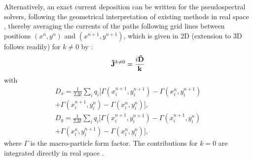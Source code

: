 Alternatively, an exact current deposition can be written for the pseudospectral solvers, following the geometrical interpretation of existing methods in real space \cite{Morsenielson1971,Villasenorcpc92,Esirkepovcpc01}, thereby averaging the currents of the paths following grid lines between positions $(x^n,y^n)$ and $(x^{n+1},y^{n+1})$, which is given in 2D (extension to 3D follows readily) for $k\neq0$ by  \cite{VayJCP2013}:
%
\begin{eqnarray}
\mathbf{\tilde{J}}^{k\neq0}=\frac{i\mathbf{\tilde{D}}}{\mathbf{k}}
\end{eqnarray}
with 
\begin{eqnarray}
D_x   =  \frac{1}{2\Delta t}\sum_i q_i
  [\Gamma(x_i^{n+1},y_i^{n+1})-\Gamma(x_i^{n},y_i^{n+1}) \nonumber\\ 
+\Gamma(x_i^{n+1},y_i^{n})-\Gamma(x_i^{n},y_i^{n})],\\
D_y   =  \frac{1}{2\Delta t}\sum_i q_i
  [\Gamma(x_i^{n+1},y_i^{n+1})-\Gamma(x_i^{n+1},y_i^{n}) \nonumber \\
+\Gamma(x_i^{n},y_i^{n+1})-\Gamma(x_i^{n},y_i^{n})],
\end{eqnarray}
where $\Gamma$ is the macro-particle form factor. 
%
The contributions for $k=0$ are integrated directly in real space  \cite{VayJCP2013}.
